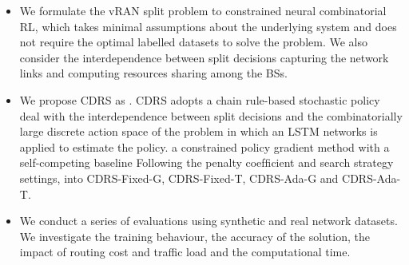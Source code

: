 \begin{itemize}
	\item  We formulate the vRAN split problem to constrained neural combinatorial RL, which takes minimal assumptions about the underlying system and does not require the optimal labelled datasets to solve the problem. We also consider the interdependence between split decisions capturing the network links and computing resources sharing among the BSs.
	
	
	\item We propose CDRS as . CDRS adopts a chain rule-based stochastic policy  deal with the interdependence between split decisions and the combinatorially large discrete action space of the problem in which an LSTM networks is applied to estimate the policy.  a constrained policy gradient method with a self-competing baseline  Following the penalty coefﬁcient and search strategy settings,  into CDRS-Fixed-G, CDRS-Fixed-T, CDRS-Ada-G and CDRS-Ada-T.
	
	
	\item We conduct a series of evaluations using synthetic and real network datasets. We investigate the training behaviour, the accuracy of the solution, the impact of routing cost and traffic load and the computational time.  
\end{itemize}


